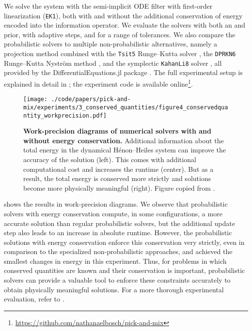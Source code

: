 \documentclass{mimosis}
\begin{document}
We solve the system with the semi-implicit ODE filter with first-order linearization (\texttt{EK1}), both with and without the additional conservation of energy encoded into the information operator.
We evaluate the solvers with both an  and  prior, with adaptive steps, and for a range of tolerances.
We also compare the probabilistic solvers to multiple non-probabilistic alternatives, namely a projection method combined with the \texttt{Tsit5} Runge--Kutta solver \parencite{hairer2006geometric,tsit5},
the \texttt{DPRKN6} Runge--Kutta Nyström method \parencite{dormand1987runge},
and the symplectic \texttt{KahanLi8} solver \parencite{kahan1997composition},
all provided by the DifferentialEquations.jl package \parencite{rackauckas2017differentialequations}.
The full experimental setup is explained in detail in
\pickandmix{};
the experiment code is available online\footnote{\url{https://github.com/nathanaelbosch/pick-and-mix}}.

\begin{figure}[t]
\centering
\texttt{[image: ./code/papers/pick-and-mix/experiments/3\_conserved\_quantities/figure4\_conservedquantity\_workprecision.pdf]}
\caption{\label{fig:pickandmix:hamiltonian}\textbf{Work-precision diagrams of numerical solvers with and without energy conservation.} Additional information about the total energy in the dynamical Hénon--Heiles system can improve the accuracy of the solution (left). This comes with additional computational cost and increases the runtime (center). But as a result, the total energy is conserved more strictly and solutions become more physically meaningful (right). Figure copied from \protect\pickandmix{}.}
\end{figure}

 shows the results in work-precision diagrams.
We observe that probabilistic solvers with energy conservation compute, in some configurations, a more accurate solution than regular probabilistic solvers, but the additional update step also leads to an increase in absolute runtime.
However, the probabilistic solutions with energy conservation enforce this conservation very strictly, even in comparison to the specialized non-probabilistic approaches, and achieved the smallest changes in energy in this experiment.
Thus, for problems in which conserved quantities are known and their conservation is important, probabilistic solvers can provide a valuable tool to enforce these constraints accurately to obtain physically meaningful solutions.
For a more thorough experimental evaluation, refer to
\pickandmix{}.
\end{document}
